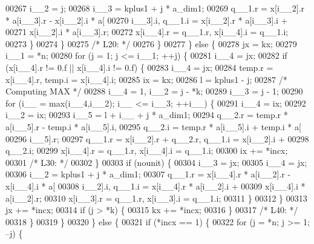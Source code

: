 \begin{DoxyCode}
00267                 i\_\_2 = j;
00268                 i\_\_3 = kplus1 + j * a\_dim1;
00269                 q\_\_1.r = x[i\_\_2].r * a[i\_\_3].r - x[i\_\_2].i * a[
00270                     i\_\_3].i, q\_\_1.i = x[i\_\_2].r * a[i\_\_3].i + 
00271                     x[i\_\_2].i * a[i\_\_3].r;
00272                 x[i\_\_4].r = q\_\_1.r, x[i\_\_4].i = q\_\_1.i;
00273             \}
00274             \}
00275 \textcolor{comment}{/* L20: */}
00276         \}
00277         \} \textcolor{keywordflow}{else} \{
00278         jx = kx;
00279         i\_\_1 = *n;
00280         \textcolor{keywordflow}{for} (j = 1; j <= i\_\_1; ++j) \{
00281             i\_\_4 = jx;
00282             \textcolor{keywordflow}{if} (x[i\_\_4].r != 0.f || x[i\_\_4].i != 0.f) \{
00283             i\_\_4 = jx;
00284             temp.r = x[i\_\_4].r, temp.i = x[i\_\_4].i;
00285             ix = kx;
00286             l = kplus1 - j;
00287 \textcolor{comment}{/* Computing MAX */}
00288             i\_\_4 = 1, i\_\_2 = j - *k;
00289             i\_\_3 = j - 1;
00290             \textcolor{keywordflow}{for} (i\_\_ = max(i\_\_4,i\_\_2); i\_\_ <= i\_\_3; ++i\_\_) \{
00291                 i\_\_4 = ix;
00292                 i\_\_2 = ix;
00293                 i\_\_5 = l + i\_\_ + j * a\_dim1;
00294                 q\_\_2.r = temp.r * a[i\_\_5].r - temp.i * a[i\_\_5].i, 
00295                     q\_\_2.i = temp.r * a[i\_\_5].i + temp.i * a[
00296                     i\_\_5].r;
00297                 q\_\_1.r = x[i\_\_2].r + q\_\_2.r, q\_\_1.i = x[i\_\_2].i + 
00298                     q\_\_2.i;
00299                 x[i\_\_4].r = q\_\_1.r, x[i\_\_4].i = q\_\_1.i;
00300                 ix += *incx;
00301 \textcolor{comment}{/* L30: */}
00302             \}
00303             \textcolor{keywordflow}{if} (nounit) \{
00304                 i\_\_3 = jx;
00305                 i\_\_4 = jx;
00306                 i\_\_2 = kplus1 + j * a\_dim1;
00307                 q\_\_1.r = x[i\_\_4].r * a[i\_\_2].r - x[i\_\_4].i * a[
00308                     i\_\_2].i, q\_\_1.i = x[i\_\_4].r * a[i\_\_2].i + 
00309                     x[i\_\_4].i * a[i\_\_2].r;
00310                 x[i\_\_3].r = q\_\_1.r, x[i\_\_3].i = q\_\_1.i;
00311             \}
00312             \}
00313             jx += *incx;
00314             \textcolor{keywordflow}{if} (j > *k) \{
00315             kx += *incx;
00316             \}
00317 \textcolor{comment}{/* L40: */}
00318         \}
00319         \}
00320     \} \textcolor{keywordflow}{else} \{
00321         \textcolor{keywordflow}{if} (*incx == 1) \{
00322         \textcolor{keywordflow}{for} (j = *n; j >= 1; --j) \{

\end{DoxyCode}
